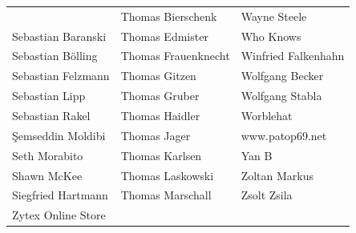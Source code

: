 \begin{small}
\begin{tabular}{p{4cm}p{4cm}p{4cm}}
& Thomas Bierschenk & Wayne Steele \\Sebastian Baranski & Thomas Edmister & Who Knows \\Sebastian Bölling & Thomas Frauenknecht & Winfried Falkenhahn \\Sebastian Felzmann & Thomas Gitzen & Wolfgang Becker \\Sebastian Lipp & Thomas Gruber & Wolfgang Stabla \\Sebastian Rakel & Thomas Haidler & Worblehat \\Şemseddin Moldibi & Thomas Jager & www.patop69.net \\Seth Morabito & Thomas Karlsen & Yan B \\Shawn McKee & Thomas Laskowski & Zoltan Markus \\Siegfried Hartmann & Thomas Marschall & Zsolt Zsila \\Zytex Online Store &  &  \\
\end{tabular}
\end{small}
\ifdefined\printmanual
\else
{}
\fi

